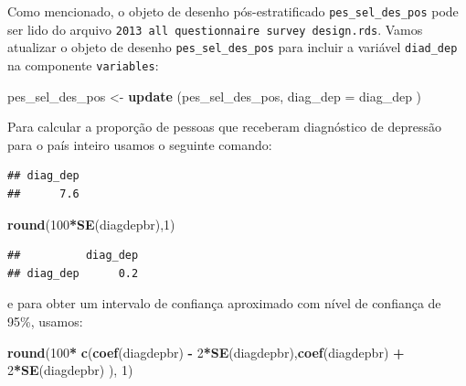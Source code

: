 \documentclass[]{book}
\newenvironment{Shaded}{\begin{snugshade}}{\end{snugshade}}
\newcommand{\KeywordTok}[1]{\textcolor[rgb]{0.13,0.29,0.53}{\textbf{#1}}}
\newcommand{\DataTypeTok}[1]{\textcolor[rgb]{0.13,0.29,0.53}{#1}}
\newcommand{\DecValTok}[1]{\textcolor[rgb]{0.00,0.00,0.81}{#1}}
\newcommand{\StringTok}[1]{\textcolor[rgb]{0.31,0.60,0.02}{#1}}
\newcommand{\CommentTok}[1]{\textcolor[rgb]{0.56,0.35,0.01}{\textit{#1}}}
\newcommand{\OperatorTok}[1]{\textcolor[rgb]{0.81,0.36,0.00}{\textbf{#1}}}
\newcommand{\NormalTok}[1]{#1}
\theoremstyle{definition}
\theoremstyle{definition}
\theoremstyle{definition}
\theoremstyle{remark}
\begin{document}
Como mencionado, o objeto de desenho pós-estratificado
\texttt{pes\_sel\_des\_pos} pode ser lido do arquivo
\texttt{2013\ all\ questionnaire\ survey\ design.rds}. Vamos atualizar o
objeto de desenho \texttt{pes\_sel\_des\_pos} para incluir a variável
\texttt{diad\_dep} na componente \texttt{variables}:

\begin{Shaded}
\begin{Highlighting}[]
\NormalTok{pes_sel_des_pos <-}\StringTok{ }\KeywordTok{update}\NormalTok{ (pes_sel_des_pos, }\DataTypeTok{diag_dep =}\NormalTok{ diag_dep )}
\end{Highlighting}
\end{Shaded}

Para calcular a proporção de pessoas que receberam diagnóstico de
depressão para o país inteiro usamos o seguinte comando:

\begin{Shaded}
\end{Shaded}

\begin{verbatim}
## diag_dep 
##      7.6
\end{verbatim}

\begin{Shaded}
\begin{Highlighting}[]
\KeywordTok{round}\NormalTok{(}\DecValTok{100}\OperatorTok{*}\KeywordTok{SE}\NormalTok{(diagdepbr),}\DecValTok{1}\NormalTok{)}
\end{Highlighting}
\end{Shaded}

\begin{verbatim}
##          diag_dep
## diag_dep      0.2
\end{verbatim}

e para obter um intervalo de confiança aproximado com nível de confiança
de 95\%, usamos:

\begin{Shaded}
\begin{Highlighting}[]
\KeywordTok{round}\NormalTok{(}\DecValTok{100}\OperatorTok{*}\StringTok{ }\KeywordTok{c}\NormalTok{(}\KeywordTok{coef}\NormalTok{(diagdepbr) }\OperatorTok{-}\StringTok{ }\DecValTok{2}\OperatorTok{*}\KeywordTok{SE}\NormalTok{(diagdepbr),}\KeywordTok{coef}\NormalTok{(diagdepbr) }\OperatorTok{+}\StringTok{ }\DecValTok{2}\OperatorTok{*}\KeywordTok{SE}\NormalTok{(diagdepbr)  ), }\DecValTok{1}\NormalTok{)}
\end{Highlighting}
\end{Shaded}
\end{document}
